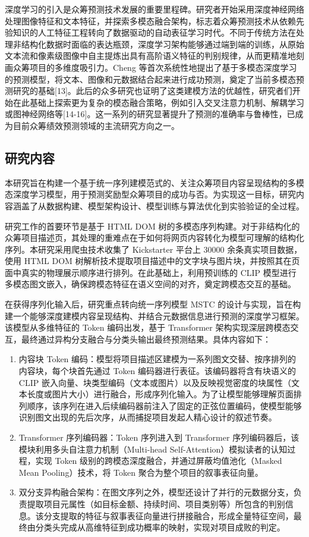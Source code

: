 深度学习的引入是众筹预测技术发展的重要里程碑。研究者开始采用深度神经网络处理图像特征和文本特征，并探索多模态融合架构，标志着众筹预测技术从依赖先验知识的人工特征工程转向了数据驱动的自动表征学习时代。不同于传统方法在处理非结构化数据时面临的表达瓶颈，深度学习架构能够通过端到端的训练，从原始文本流和像素级图像中自主提炼出具有高阶语义特征的判别规律，从而更精准地刻画众筹项目的多维度吸引力。Cheng 等首次系统性地提出了基于多模态深度学习的预测模型，将文本、图像和元数据结合起来进行成功预测，奠定了当前多模态预测研究的基础[13]。此后的众多研究也证明了这类建模方法的优越性，研究者们开始在此基础上探索更为复杂的模态融合策略，例如引入交叉注意力机制、解耦学习或图神经网络等[14-16]。这一系列的研究显著提升了预测的准确率与鲁棒性，已成为目前众筹绩效预测领域的主流研究方向之一。

\subsection{研究内容}
本研究旨在构建一个基于统一序列建模范式的、关注众筹项目内容呈现结构的多模态深度学习模型，用于预测奖励型众筹项目的成功与否。为实现这一目标，研究内容涵盖了从数据构建、模型架构设计、模型训练与算法优化到实验验证的全过程。

研究工作的首要环节是基于 HTML DOM 树的多模态序列构建。对于非结构化的众筹项目描述页，其处理的重难点在于如何将网页内容转化为模型可理解的结构化序列。本研究采用爬虫技术收集了 Kickstarter 平台上 30000 余条真实项目数据，使用 HTML DOM 树解析技术提取项目描述中的文字块与图片块，并按照其在页面中真实的物理展示顺序进行排列。在此基础上，利用预训练的 CLIP 模型进行多模态图文嵌入，确保跨模态特征在语义空间的对齐，奠定跨模态交互的基础。

在获得序列化输入后，研究重点转向统一序列模型 MSTC 的设计与实现，旨在构建一个能够深度建模内容呈现结构、并结合元数据信息进行预测的深度学习框架。该模型从多维特征的 Token 编码出发，基于 Transformer 架构实现深层跨模态交互，最终通过异构分支融合与分类头输出最终预测结果。具体内容如下：

\begin{enumerate}[label=(\arabic*)]
  \item 内容块 Token 编码：模型将项目描述区建模为一系列图文交替、按序排列的内容块，每个块首先通过 Token 编码器进行表征。该编码器将含有块语义的 CLIP 嵌入向量、块类型编码（文本或图片）以及反映视觉密度的块属性（文本长度或图片大小）进行融合，形成序列化输入。为了让模型能够理解页面排列顺序，该序列在进入后续编码器前注入了固定的正弦位置编码，使模型能够识别图文出现的先后次序，从而捕捉项目发起人精心设计的叙述节奏。
  \item Transformer 序列编码器：Token 序列进入到 Transformer 序列编码器后，该模块利用多头自注意力机制（Multi-head Self-Attention）模拟读者的认知过程，实现 Token 级别的跨模态深度融合，并通过屏蔽均值池化（Masked Mean Pooling）技术，将 Token 聚合为整个项目的叙事表征向量。
  \item 双分支异构融合架构：在图文序列之外，模型还设计了并行的元数据分支，负责提取项目元属性（如目标金额、持续时间、项目类别等）所包含的判别信息。该分支提取的特征与叙事表征向量进行拼接融合，形成全量特征空间，最终由分类头完成从高维特征到成功概率的映射，实现对项目成败的判定。
\end{enumerate}

